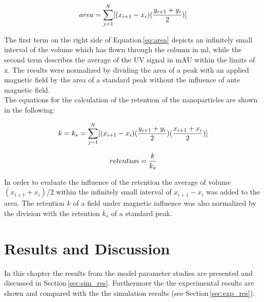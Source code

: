 \begin{equation}
\label{eq:area}
\centering
area = \sum_{j=1}^{N}[(x_{i+1}-x_{i})(\frac{y_{i+1}+y_{i}}{2})]
\end{equation}

The first term on the right side of Equation\,\ref{eq:area} depicts an infinitely small interval of the volume which has flown through the column in ml, while the second term describes the average of the UV signal in mAU within the limits of x. The results were normalized by dividing the area of a peak with an applied magnetic field by the area of a standard peak without the influence of ante magnetic field. \\


The equations for the calculation of the retention of the nanoparticles are shown in the following: 

\begin{equation}
\label{eq:ret_sum}
\centering
k = k_{s} = \sum_{j=1}^{N}[(x_{i+1}-x_{i})(\frac{y_{i+1}+y_{i}}{2})(\frac{x_{i+1}+x_{i}}{2})]
\end{equation}

\begin{equation}
\label{eq:ret_comp}
\centering
retention = \frac{k}{k_{s}}
\end{equation}

In order to evaluate the influence of the retention the average of volume $(x_{i+1}+x_{i})/2$ within the infinitely small interval of $x_{i+1}-x_{i}$ was added to the area. The retention $k$ of a field under magnetic influence was also normalized by the division with the retention $k_{s}$ of a standard peak.   



\chapter{Results and Discussion}
\label{chap:chap_res}
In this chapter the results from the model parameter studies are presented and discussed in Section\,\ref{sec:sim_res}. Furthermore the the experimental results are shown and compared with the the simulation results (see Section\,\ref{sec:exp_res}). 


